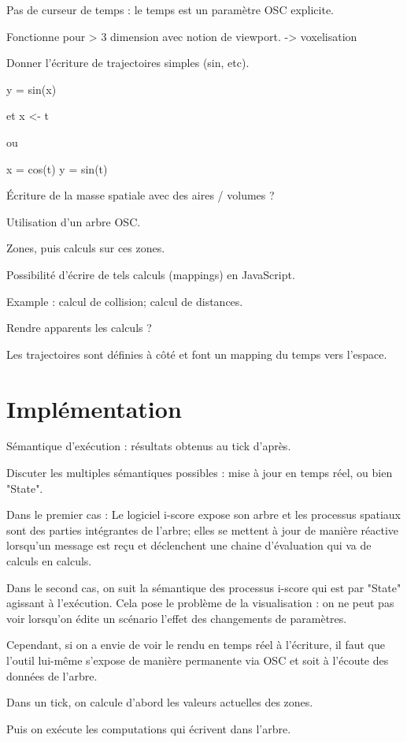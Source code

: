 \documentclass[french]{article}
\begin{document}
Pas de curseur de temps : le temps est un paramètre OSC explicite.

Fonctionne pour > 3 dimension avec notion de viewport.
-> voxelisation

Donner l'écriture de trajectoires simples (sin, etc).

y = sin(x)

et x <- t

ou

x = cos(t)
y = sin(t)

Écriture de la masse spatiale avec des aires / volumes ?

Utilisation d'un arbre OSC.

Zones, puis calculs sur ces zones. 

Possibilité d'écrire de tels calculs (mappings) en JavaScript.

Example : calcul de collision; calcul de distances.

Rendre apparents les calculs ?

Les trajectoires sont définies à côté et font un mapping du temps vers l'espace.

\section{Implémentation}

Sémantique d'exécution : résultats obtenus au tick d'après.

Discuter les multiples sémantiques possibles : mise à jour en temps réel, ou bien "State".

Dans le premier cas : 
Le logiciel i-score expose son arbre et les processus spatiaux sont des parties 
intégrantes de l'arbre; elles se mettent à jour de manière réactive lorsqu'un message est reçu
et déclenchent une chaine d'évaluation qui va de calculs en calculs.

Dans le second cas, on suit la sémantique des processus i-score qui est par "State" agissant à l'exécution.
Cela pose le problème de la visualisation : on ne peut pas voir lorsqu'on édite un scénario l'effet
des changements de paramètres.

Cependant, si on a envie de voir le rendu en temps réel à l'écriture, 
il faut que l'outil lui-même s'expose de manière permanente via OSC 
et soit à l'écoute des données de l'arbre.


Dans un tick, on calcule d'abord les valeurs actuelles des zones.

Puis on exécute les computations qui écrivent dans l'arbre.
\end{document}
